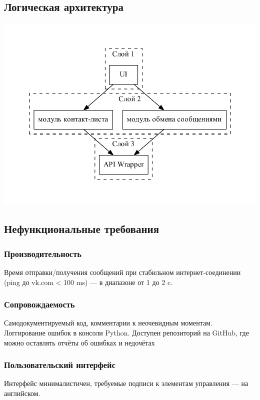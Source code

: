 \documentclass[12pt]{article}
\begin{document}
\subsection{Логическая архитектура}
\includegraphics{../HLA/diag/logic.pdf}

\subsection{Нефункциональные требования}

\subsubsection*{Производительность}
Время отправки/получения сообщений при стабильном интернет-соединении (ping до vk.com < 100 ms) — в диапазоне от 1 до 2 c.

\subsubsection{Сопровождаемость}
Самодокументируемый код, комментарии к неочевидным моментам. Логгирование ошибок в консоли Python. Доступен репозиторий на GitHub, где можно оставлять отчёты об ошибках и недочётах

\subsubsection{Пользовательский интерфейс}
Интерфейс минималистичен, требуемые подписи к элементам управления — на английском.
\end{document}
